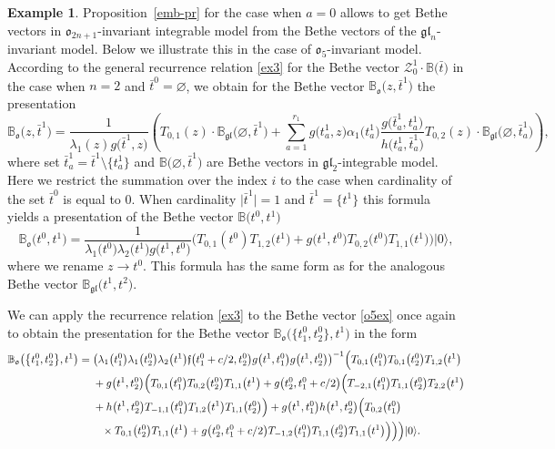 \documentclass[10pt,a4paper]{amsart}
\newcommand{\bt}{{\bar t}}
\theoremstyle{definition}
\newtheorem{exam}[thm]{Example}
\def\BB{{\mathbb{B}}}
\def\r#1{\eqref{#1}}
\def\fgo{\mathfrak{f}}
\def\rvec{|0\rangle}
\def\BBo{\mathbb{B}_{\mathfrak{o}}}
\def\BBg{\mathbb{B}_{\mathfrak{gl}}}
\def\Z{\mathcal{Z}}
\begin{document}
\begin{exam}\label{Exam41}
Proposition~{\rm\ref{emb-pr}} for the case when $a=0$ allows
to get Bethe vectors in $\mathfrak{o}_{2n+1}$-invariant integrable model
from the Bethe vectors of the $\mathfrak{gl}_{n}$-invariant model.
Below we illustrate this in the case of $\mathfrak{o}_5$-invariant
model.
According to the general recurrence relation \r{ex3} for the Bethe vector
$\Z_0^1\cdot\BB\bigl(\bt\bigr)$ in the case when $n=2$ and $\bt^0=\varnothing$,
we obtain for the Bethe vector $\BBo\bigl(z,\bt^1\bigr)$ the presentation
\begin{equation*}
\BBo\bigl(z,\bt^1\bigr)=\frac{1}{\lambda_1(z) g\bigl(\bt^1,z\bigr)}
\left(
T_{0,1}(z)\cdot\BBg\bigl(\varnothing,\bt^1\bigr)+
\sum_{a=1}^{r_1}g\bigl(t^1_a,z\bigr) \alpha_1\bigl(t^1_a\bigr)
\frac{g\bigl(\bt^1_a,t^1_a\bigr)}{h\bigl(t^1_a,\bt^1_a\bigr)} T_{0,2}(z)\cdot\BBg\bigl(\varnothing,\bt^1_a\bigr)
\right),
\end{equation*}
where set $\bt^1_a=\bt^1\setminus\bigl\{t^1_a\bigr\}$ and
$\BB\bigl(\varnothing,\bt^1\bigr)$ are Bethe vectors in
$\mathfrak{gl}_2$-integrable model.
 Here we restrict the summation over the index $i$ to the case when cardinality of the set $\bt^0$
is equal to $0$. When cardinality $\big|\bt^1\big|=1$ and $\bt^1=\bigl\{t^1\bigr\}$ this formula
yields a presentation of the Bethe vector $\BB\bigl(t^0,t^1\bigr)$
\begin{equation}\label{o5ex}
\BBo\bigl(t^0,t^1\bigr)=\frac{1}{\lambda_1\bigl(t^0\bigr) \lambda_2\bigl(t^1\bigr) g\bigl(t^1,t^0\bigr)}
\bigl(T_{0,1}(t^0) T_{1,2}\bigl(t^1\bigr)+g\bigl(t^1,t^0\bigr) T_{0,2}\bigl(t^0\bigr) T_{1,1}\bigl(t^1\bigr)\bigr)\rvec ,
\end{equation}
 where we rename $z\to t^0$. This formula has the same form as for the analogous Bethe vector $\BBg\bigl(t^1,t^2\bigr)$.

We can apply the recurrence relation \r{ex3} to the Bethe vector \r{o5ex}
once again to obtain the presentation for the Bethe vector $\BBo\bigl(\bigl\{t^0_1,t^0_2\bigr\},t^1\bigr)$
in the form
\begin{align*}
\BBo\bigl(\bigl\{t^0_1,t^0_2\bigr\},t^1\bigr)={}&
\bigl({\lambda_1\bigl(t^0_1\bigr) \lambda_1\bigl(t^0_2\bigr) \lambda_2\bigl(t^1\bigr)
\fgo\bigl(t^0_1+c/2,t^0_2\bigr) g\bigl(t^1,t^0_1\bigr) g\bigl(t^1,t^0_2\bigr)}\bigr)^{-1}\Bigl(T_{0,1}\bigl(t^0_1\bigr) T_{0,1}\bigl(t^0_2\bigr) T_{1,2}\bigl(t^1\bigr)\\
&+
g\bigl(t^1,t^0_2\bigr)\Bigl(T_{0,1}\bigl(t^0_1\bigr) T_{0,2}\bigl(t^0_2\bigr) T_{1,1}\bigl(t^1\bigr)+ g\bigl(t^0_2,t^0_1+c/2\bigr)\Bigl(T_{-2,1}\bigl(t^0_1\bigr) T_{1,1}\bigl(t^0_2\bigr) T_{2,2}\bigl(t^1\bigr)\\
&+
h\bigl(t^1,t^0_2\bigr) T_{-1,1}\bigl(t^0_1\bigr) T_{1,2}\bigl(t^1\bigr) T_{1,1}\bigl(t^0_2\bigr)
\Bigr)+g\bigl(t^1,t^0_1\bigr) h\bigl(t^1,t^0_2\bigr)\Bigl(T_{0,2}\bigl(t^0_1\bigr) \\
& \phantom{+}{}\times T_{0,1}\bigl(t^0_2\bigr) T_{1,1}\bigl(t^1\bigr)+
g\bigl(t^0_2,t^0_1+c/2\bigr)
T_{-1,2}\bigl(t^0_1\bigr) T_{1,1}\bigl(t^0_2\bigr) T_{1,1}\bigl(t^1\bigr)\Bigr)\Bigr)\Bigr)\rvec .
\end{align*}


\end{exam}
\end{document}
